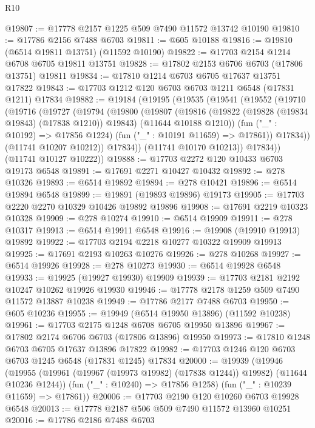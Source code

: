\begin{lexlean}{R10}
\begin{coremodule}
@19807 := @17778 @2157 @1225 @509 @7490 @11572 @13742 @10190
@19810 := @17786 @2156 @7488 @6703
@19811 := @605 @10188
@19816 := @19810 (@6514 @19811 @13751) (@11592 @10190)
@19822 := @17703 @2154 @1214 @6708 @6705 @19811 @13751
@19828 := @17802 @2153 @6706 @6703 (@17806 @13751) @19811
@19834 := @17810 @1214 @6703 @6705 @17637 @13751 @17822
@19843 := @17703 @1212 @120 @6703 @6703 @1211 @6548 (@17831 @1211) @17834
@19882 := @19184
    (@19195
      (@19535
        (@19541
          (@19552
            (@19710
              (@19716
                (@19727
                  (@19794
                    (@19800
                      (@19807
                        (@19816
                          (@19822 (@19828 (@19834 @19843) (@17838 @1210)) @19843)
                          (@11644 @10188 @1210))
                        (fun ("_" : @10192) => @17856 @1224)
                        (fun ("_" : @10191 @11659) => @17861))
                      @17834))
                  (@11741 @10207 @10212))
                @17834))
            (@11741 @10170 @10213))
          @17834))
      (@11741 @10127 @10222))
@19888 := @17703 @2272 @120 @10433 @6703 @19173 @6548
@19891 := @17691 @2271 @10427 @10432
@19892 := @278 @10326
@19893 := @6514 @19892
@19894 := @278 @10421
@19896 := @6514 @19894 @6548
@19899 := @19891 (@19893 @19896) @19173
@19905 := @17703 @2220 @2270 @10329 @10426 @19892 @19896
@19908 := @17691 @2219 @10323 @10328
@19909 := @278 @10274
@19910 := @6514 @19909
@19911 := @278 @10317
@19913 := @6514 @19911 @6548
@19916 := @19908 (@19910 @19913) @19892
@19922 := @17703 @2194 @2218 @10277 @10322 @19909 @19913
@19925 := @17691 @2193 @10263 @10276
@19926 := @278 @10268
@19927 := @6514 @19926
@19928 := @278 @10273
@19930 := @6514 @19928 @6548
@19933 := @19925 (@19927 @19930) @19909
@19939 := @17703 @2181 @2192 @10247 @10262 @19926 @19930
@19946 := @17778 @2178 @1259 @509 @7490 @11572 @13887 @10238
@19949 := @17786 @2177 @7488 @6703
@19950 := @605 @10236
@19955 := @19949 (@6514 @19950 @13896) (@11592 @10238)
@19961 := @17703 @2175 @1248 @6708 @6705 @19950 @13896
@19967 := @17802 @2174 @6706 @6703 (@17806 @13896) @19950
@19973 := @17810 @1248 @6703 @6705 @17637 @13896 @17822
@19982 := @17703 @1246 @120 @6703 @6703 @1245 @6548 (@17831 @1245) @17834
@20000 := @19939
    (@19946
      (@19955 (@19961 (@19967 (@19973 @19982) (@17838 @1244)) @19982) (@11644 @10236 @1244))
      (fun ("_" : @10240) => @17856 @1258)
      (fun ("_" : @10239 @11659) => @17861))
@20006 := @17703 @2190 @120 @10260 @6703 @19928 @6548
@20013 := @17778 @2187 @506 @509 @7490 @11572 @13960 @10251
@20016 := @17786 @2186 @7488 @6703

\end{coremodule}
\end{lexlean}
